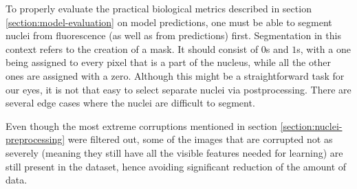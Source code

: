 To properly evaluate the practical biological metrics described in section \ref{section:model-evaluation} on model predictions, one must be able to segment nuclei from fluorescence (as well as from predictions) first. Segmentation in this context refers to the creation of a mask. It should consist of $0$s and $1$s,  with a one being assigned to every pixel that is a part of the nucleus, while all the other ones are assigned with a zero. Although this might be a straightforward task for our eyes, it is not that easy to select separate nuclei via postprocessing. There are several edge cases where the nuclei are difficult to segment.

Even though the most extreme corruptions mentioned in section \ref{section:nuclei-preprocessing} were filtered out, some of the images that are corrupted not as severely (meaning they still have all the visible features needed for learning) are still present in the dataset, hence avoiding significant reduction of the amount of data.
